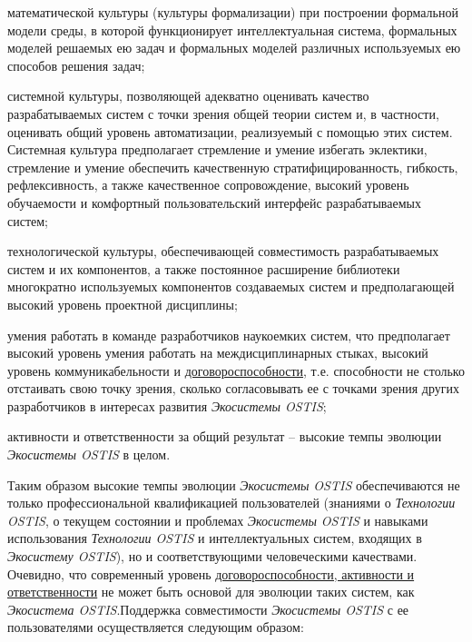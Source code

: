 \begin{SCn}
\begin{scnsubstruct}
{            \begin{scnitemize}
                \item математической культуры (культуры формализации) при построении формальной модели среды, в которой функционирует интеллектуальная система, формальных моделей решаемых ею задач и формальных моделей различных используемых ею способов решения задач;
                \item системной культуры, позволяющей адекватно оценивать качество разрабатываемых систем с точки зрения общей теории систем и, в частности, оценивать общий уровень автоматизации, реализуемый с помощью этих систем. Системная культура предполагает стремление и умение избегать эклектики, стремление и умение обеспечить качественную стратифицированность, гибкость, рефлексивность, а также качественное сопровождение, высокий уровень обучаемости и комфортный пользовательский интерфейс разрабатываемых систем;
                \item технологической культуры, обеспечивающей совместимость разрабатываемых систем и их компонентов, а также постоянное расширение библиотеки многократно используемых компонентов создаваемых систем и предполагающей высокий уровень проектной дисциплины;
                \item умения работать в команде разработчиков наукоемких систем, что предполагает высокий уровень умения работать на междисциплинарных стыках, высокий уровень коммуникабельности и \uline{договороспособности}, т.е. способности не столько отстаивать свою точку зрения, сколько согласовывать ее  с точками зрения других разработчиков в интересах развития \textit{Экосистемы OSTIS};
                \item активности и ответственности за общий результат -- высокие темпы эволюции \textit{Экосистемы OSTIS} в целом.
            \end{scnitemize}
            Таким образом высокие темпы эволюции \textit{Экосистемы OSTIS} обеспечиваются не только профессиональной квалификацией пользователей (знаниями о \textit{Технологии OSTIS}, о текущем состоянии и проблемах \textit{Экосистемы OSTIS} и навыками использования \textit{Технологии OSTIS} и интеллектуальных систем, входящих в \textit{Экосистему OSTIS}), но и соответствующими человеческими качествами. Очевидно, что современный уровень \uline{договороспособности, активности и ответственности} не может быть основой для эволюции таких систем, как \textit{Экосистема OSTIS}.Поддержка совместимости \textit{Экосистемы OSTIS} с ее пользователями осуществляется следующим образом:
}
\end{scnsubstruct}
\end{SCn}
